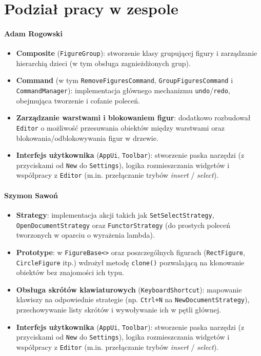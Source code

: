 \documentclass[a4paper,12pt]{article}
\begin{document}
\section{Podział pracy w zespole}

\paragraph{Adam Rogowski}
\begin{itemize}
    \item \textbf{Composite} (\texttt{FigureGroup}): stworzenie klasy grupującej figury i zarządzanie hierarchią dzieci (w tym obsługa zagnieżdżonych grup).
    \item \textbf{Command} (w tym \texttt{RemoveFiguresCommand}, \texttt{GroupFiguresCommand} i \texttt{CommandManager}): implementacja głównego mechanizmu \texttt{undo}/\texttt{redo}, obejmująca tworzenie i cofanie poleceń.
    \item \textbf{Zarządzanie warstwami i blokowaniem figur}: dodatkowo rozbudował \texttt{Editor} o możliwość przesuwania obiektów między warstwami oraz blokowania/odblokowywania figur w drzewie.
    \item \textbf{Interfejs użytkownika} (\texttt{AppUi}, \texttt{Toolbar}): stworzenie paska narzędzi (z przyciskami od \texttt{New} do \texttt{Settings}), logika rozmieszczania widgetów i współpracy z \texttt{Editor} (m.in. przełączanie trybów \emph{insert} / \emph{select}).
\end{itemize}

\paragraph{Szymon Sawoń}
\begin{itemize}
    \item \textbf{Strategy}: implementacja akcji takich jak \texttt{SetSelectStrategy}, \texttt{OpenDocumentStrategy} oraz \texttt{FunctorStrategy} (do prostych poleceń tworzonych w oparciu o wyrażenia lambda).
    \item \textbf{Prototype}: w \texttt{FigureBase<>} oraz poszczególnych figurach (\texttt{RectFigure}, \texttt{CircleFigure} itp.) wdrożył metodę \texttt{clone()} pozwalającą na klonowanie obiektów bez znajomości ich typu.
    \item \textbf{Obsługa skrótów klawiaturowych} (\texttt{KeyboardShortcut}): mapowanie klawiszy na odpowiednie strategie (np. \texttt{Ctrl+N} na \texttt{NewDocumentStrategy}), przechowywanie listy skrótów i wywoływanie ich w pętli głównej.
    \item \textbf{Interfejs użytkownika} (\texttt{AppUi}, \texttt{Toolbar}): stworzenie paska narzędzi (z przyciskami od \texttt{New} do \texttt{Settings}), logika rozmieszczania widgetów i współpracy z \texttt{Editor} (m.in. przełączanie trybów \emph{insert} / \emph{select}).
\end{itemize}
\end{document}
